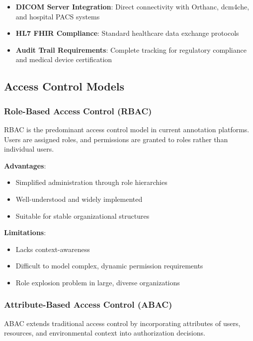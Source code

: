 \begin{itemize}
    \item \textbf{DICOM Server Integration}: Direct connectivity with Orthanc, dcm4che, and hospital PACS systems
    \item \textbf{HL7 FHIR Compliance}: Standard healthcare data exchange protocols
    \item \textbf{Audit Trail Requirements}: Complete tracking for regulatory compliance and medical device certification
\end{itemize}

\subsection{Access Control Models}
\label{subsec:access-control}

\subsubsection{Role-Based Access Control (RBAC)}

RBAC \cite{sandhu1996role} is the predominant access control model in current annotation platforms. Users are assigned roles, and permissions are granted to roles rather than individual users.

\textbf{Advantages}:
\begin{itemize}
    \item Simplified administration through role hierarchies
    \item Well-understood and widely implemented
    \item Suitable for stable organizational structures
\end{itemize}

\textbf{Limitations}:
\begin{itemize}
    \item Lacks context-awareness
    \item Difficult to model complex, dynamic permission requirements
    \item Role explosion problem in large, diverse organizations
\end{itemize}

\subsubsection{Attribute-Based Access Control (ABAC)}

ABAC \cite{hu2014guide} extends traditional access control by incorporating attributes of users, resources, and environmental context into authorization decisions.

